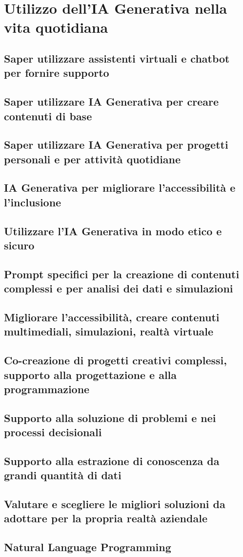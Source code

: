 \section{Utilizzo dell'IA Generativa nella vita quotidiana}
    \subsection{Saper utilizzare assistenti virtuali e chatbot per fornire supporto}
    \subsection{Saper utilizzare IA Generativa per creare contenuti di base}
    \subsection{Saper utilizzare IA Generativa per progetti personali e per attività quotidiane}
    \subsection{IA Generativa per migliorare l’accessibilità e l’inclusione}
    \subsection{Utilizzare l’IA Generativa in modo etico e sicuro}
    \subsection{Prompt specifici per la creazione di contenuti complessi e per analisi dei dati e simulazioni}
    \subsection{Migliorare l’accessibilità, creare contenuti multimediali, simulazioni, realtà virtuale}
    \subsection{Co-creazione di progetti creativi complessi, supporto alla progettazione e alla programmazione}
    \subsection{Supporto alla soluzione di problemi e nei processi decisionali}
    \subsection{Supporto alla estrazione di conoscenza da grandi quantità di dati}
    \subsection{Valutare e scegliere le migliori soluzioni da adottare per la propria realtà aziendale}
    \subsection{Natural Language Programming}
